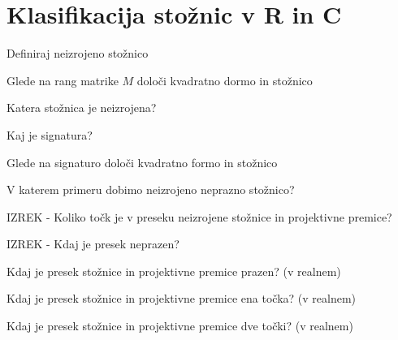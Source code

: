 \documentclass{article}
\begin{document}
    \section{Klasifikacija stožnic v R in C}
    \begin{enumerate}
        \item Definiraj neizrojeno stožnico
        \item Glede na rang matrike $M$ določi kvadratno dormo in stožnico
        \item Katera stožnica je neizrojena?
        \item Kaj je signatura?
        \item Glede na signaturo določi kvadratno formo in stožnico
        \item V katerem primeru dobimo neizrojeno neprazno stožnico?
        {\color{red}\item IZREK - Koliko točk je v preseku neizrojene stožnice in projektivne premice?}
        {\color{blue}\item IZREK - Kdaj je presek neprazen?}
        \item Kdaj je presek stožnice in projektivne premice prazen? (v realnem)
        \item Kdaj je presek stožnice in projektivne premice ena točka? (v realnem)
        \item Kdaj je presek stožnice in projektivne premice dve točki? (v realnem)
    \end{enumerate}
\end{document}
